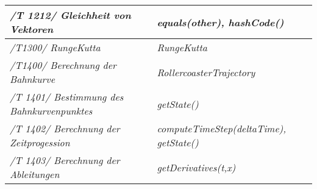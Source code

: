 \begin{longtable}{|p{.3\linewidth}|p{}}
\textit{ /T 1212/ Gleichheit von Vektoren} &  \textit{equals(other), hashCode()}\\\hline

 \textit{/T1300/ RungeKutta} &  \textit{RungeKutta}\\\hline

\textit{/T1400/ Berechnung der Bahnkurve} &  \textit{RollercoasterTrajectory}\\\hline

\textit{ /T 1401/ Bestimmung des Bahnkurvenpunktes} &  \textit{getState()}\\\hline

\textit{ /T 1402/ Berechnung der Zeitprogession} & \textit{computeTimeStep(deltaTime), getState()}\\\hline

\textit{ /T 1403/ Berechnung der Ableitungen} &  \textit{getDerivatives(t,x)}\\\hline



\end{longtable}